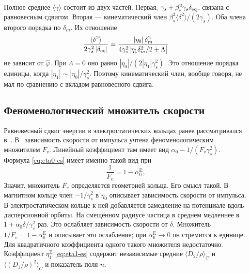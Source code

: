 Полное среднее $\langle\gamma\rangle$ состоит из двух частей. Первая, $\gamma_s+\beta_s^2\gamma_s\delta_{\mathrm{eq}}$, связана с равновесным сдвигом. Вторая --- кинематический член $\beta_s^2\langle\delta^2\rangle/(2\gamma_s)$. Оба члена второго порядка по $\delta_m$. Их отношение
\begin{equation}
\label{eq:cmp-ratio}
\frac{\langle\delta^2\rangle}{2\gamma_s^2\,|\delta_{\mathrm{eq}}|}
=\frac{|\eta_0|\,\delta_m^2}
{4\gamma_s^2\bigl|\eta_1\delta_m^2/2+\Lambda\bigr|}
\end{equation}
не зависит от $\hat\varphi$. При $\Lambda=0$ оно равно $|\eta_0|/(2|\eta_1|\gamma_s^2)$. Это отношение порядка единицы, когда $|\eta_1|\sim|\eta_0|/\gamma_s^2$. Поэтому кинематический член, вообще говоря, не мал по сравнению с вкладом равновесного сдвига.

\subsection{Феноменологический множитель скорости}

Равновесный сдвиг энергии в электростатических кольцах ранее рассматривался в~\cite{Senichev2011,Zyuzin2011,Senichev2013,Aksentyev2019}. В~\cite{Senichev2013} зависимость скорости от импульса учтена феноменологическим множителем $F_v$. Линейный коэффициент там имеет вид $\alpha_0-1/(F_v\gamma_s^2)$. Формула \eqref{eq:eta0-es} имеет именно такой вид при
\begin{equation}
\label{eq:cmp-Fv}
\frac{1}{F_v}=1-\alpha_0^{\mathrm{E}},
\end{equation}
Значит, множитель $F_v$ определяется геометрией кольца. Его смысл такой. В магнитном кольце член $-1/\gamma_s^2$ в $\eta_0$ описывает зависимость скорости от импульса. В электростатическом кольце к ней добавляется замедление на потенциале вдоль дисперсионной орбиты. На смещённом радиусе частица в среднем медленнее в $1+\alpha_0\delta/\gamma_s^2$ раз. Это ослабляет зависимость скорости от $\delta$. Множитель $1/F_v=1-\alpha_0^{\mathrm{E}}$ и описывает это ослабление; при $\alpha_0^{\mathrm{E}}\to0$ он стремится к единице. Для квадратичного коэффициента одного такого множителя недостаточно. Коэффициент $\eta_1^{\mathrm{E}}$ \eqref{eq:eta1-es} содержит независимые средние $\langle D_2/\rho\rangle_C$ и $\langle(D_1/\rho)^2\rangle_C$ и показатель поля $n$.